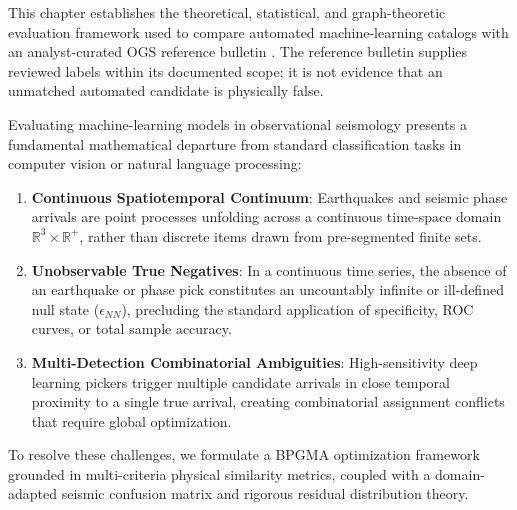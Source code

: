 
\label{chap:pipeline_evaluation}

This chapter establishes the theoretical, statistical, and
graph-theoretic evaluation framework used to compare automated
machine-learning catalogs with an analyst-curated \ac{OGS} reference
bulletin \parencite{SMINO}. The reference bulletin supplies reviewed
labels within its documented scope; it is not evidence that an
unmatched automated candidate is physically false.

Evaluating machine-learning models in observational seismology
presents a fundamental mathematical departure from standard
classification tasks in computer vision or natural language processing:
\begin{enumerate}
  \item \textbf{Continuous Spatiotemporal Continuum}: Earthquakes
    and seismic phase arrivals are point processes unfolding across
    a continuous time-space domain $\mathbb{R}^3 \times
    \mathbb{R}^+$, rather than discrete items drawn from
    pre-segmented finite sets.
  \item \textbf{Unobservable True Negatives}: In a continuous time
    series, the absence of an earthquake or phase pick constitutes
    an uncountably infinite or ill-defined null state
    ($\epsilon_{NN}$), precluding the standard application of
    specificity, ROC curves, or total sample accuracy.
  \item \textbf{Multi-Detection Combinatorial Ambiguities}:
    High-sensitivity deep learning pickers trigger multiple
    candidate arrivals in close temporal proximity to a single true
    arrival, creating combinatorial assignment conflicts that
    require global optimization.
\end{enumerate}

To resolve these challenges, we formulate a \acf{BPGMA} optimization framework
grounded in multi-criteria physical similarity metrics, coupled with a
domain-adapted seismic confusion matrix and rigorous residual distribution
theory.

